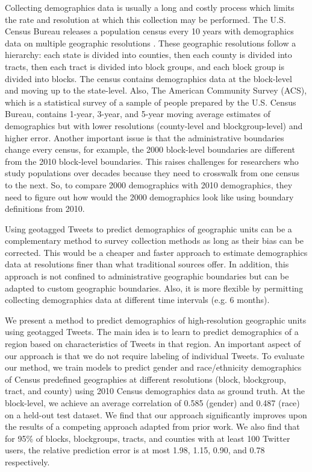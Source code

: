 \documentclass[letterpaper]{article}
\begin{document}
Collecting demographics data is usually a long and costly process which limits the rate and resolution at which this collection may be performed. The U.S. Census Bureau releases a population census every 10 years with demographics data on multiple geographic resolutions \cite{census2010}. These geographic resolutions follow a hierarchy: each state is divided into counties, then each county is divided into tracts, then each tract is divided into block groups, and each block group is divided into blocks. The census contains demographics data at the block-level and moving up to the state-level. Also, The American Community Survey (ACS), which is a statistical survey of a sample of people prepared by the U.S. Census Bureau, contains 1-year, 3-year, and 5-year moving average estimates of demographics but with lower resolutions (county-level and blockgroup-level) and higher error. Another important issue is that the administrative boundaries change every census, for example, the 2000 block-level boundaries are different from the 2010 block-level boundaries. This raises challenges for researchers who study populations over decades because they need to crosswalk from one census to the next. So, to compare 2000 demographics with 2010 demographics, they need to figure out how would the 2000 demographics look like using boundary definitions from 2010.

Using geotagged Tweets to predict demographics of geographic units can be a complementary method to survey collection methods as long as their bias can be corrected. This would be a cheaper and faster approach to estimate demographics data at resolutions finer than what traditional sources offer. In addition, this approach is not confined to administrative geographic boundaries but can be adapted to custom geographic boundaries. Also, it is more flexible by permitting collecting demographics data at different time intervals (e.g. 6 months).

We present a method to predict demographics of high-resolution geographic units using geotagged Tweets. The main idea is to learn to predict demographics of a region based on characteristics of Tweets in that region. An important aspect of our approach is that we do not require labeling of individual Tweets. To evaluate our method, we train models to predict gender and race/ethnicity demographics of Census predefined geographies at different resolutions (block, blockgroup, tract, and county) using 2010 Census demographics data as ground truth. At the block-level, we achieve an average correlation of 0.585 (gender) and 0.487 (race) on a held-out test dataset. We find that our approach significantly improves upon the results of a competing approach adapted from prior work. We also find that for 95\% of blocks, blockgroups, tracts, and counties with at least 100 Twitter users, the relative prediction error is at most 1.98, 1.15, 0.90, and 0.78 respectively.
\end{document}
